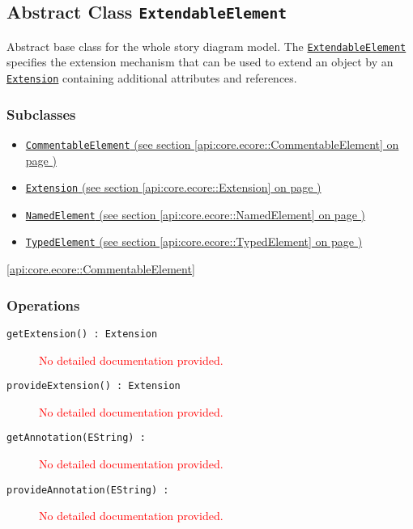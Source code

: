 \subsection{Abstract Class \texttt{ExtendableElement}}
\label{api:core.ecore::ExtendableElement}
Abstract base class for the whole story diagram model. The \hyperref[ExtendableElement]{\texttt{ExtendableElement}} specifies the extension mechanism that can be used to extend an object by an \hyperref[Extension]{\texttt{Extension}} containing additional attributes and references.
\subsubsection*{Subclasses}
\begin{itemize}
\item \hyperref[api:core.ecore::CommentableElement]{\texttt{CommentableElement} (see section \ref*{api:core.ecore::CommentableElement} on page \pageref*{api:core.ecore::CommentableElement})}
\item \hyperref[api:core.ecore::Extension]{\texttt{Extension} (see section \ref*{api:core.ecore::Extension} on page \pageref*{api:core.ecore::Extension})}
\item \hyperref[api:core.ecore::NamedElement]{\texttt{NamedElement} (see section \ref*{api:core.ecore::NamedElement} on page \pageref*{api:core.ecore::NamedElement})}
\item \hyperref[api:core.ecore::TypedElement]{\texttt{TypedElement} (see section \ref*{api:core.ecore::TypedElement} on page \pageref*{api:core.ecore::TypedElement})}
\end{itemize}

\ref{api:core.ecore::CommentableElement}

\subsubsection*{Operations}
\begin{description}
\item[\texttt{getExtension() : Extension}] \textcolor{red}{No detailed documentation provided.}
\item[\texttt{provideExtension() : Extension}] \textcolor{red}{No detailed documentation provided.}
\item[\texttt{getAnnotation(EString) : }] \textcolor{red}{No detailed documentation provided.}
\item[\texttt{provideAnnotation(EString) : }] \textcolor{red}{No detailed documentation provided.}
\end{description}
